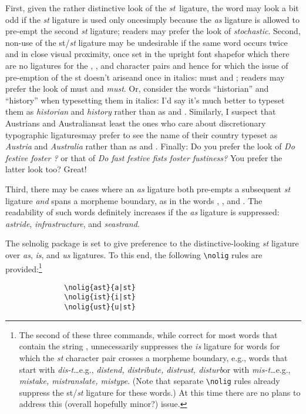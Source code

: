 \documentclass[11pt]{article}
\newcommand{\pkg}[1]{\textsf{#1}}
\newcommand{\opt}[1]{\uselig{\texttt{#1}}}
\newcommand{\cmmd}[1]{\texttt{\textbackslash #1}}
\begin{document}
First, given the rather distinctive look of the \emph{st}~ligature, the word \opt{stochastic} may look a bit odd if the \emph{st} ligature is used only once\textemdash\emph{}\textemdash simply because the \emph{as} ligature is allowed to pre-empt the second \emph{st} ligature; readers may prefer the look of \emph{stochastic}. Second, non-use of the st/\emph{st} ligature may be undesirable if the same word occurs twice and in close visual proximity, once set in the upright font shape\textemdash for which there are no ligatures for the \opt{as}, \opt{is}, and \opt{us} character pairs and hence for which the issue of pre-emption of the st doesn't arise\textemdash and once in italics: must and \emph{}; readers may prefer the look of must and \emph{must}. Or, consider the words \enquote{historian} and \enquote{history} when typesetting them in italics: I'd say it's much better to typeset them as \emph{historian} and \emph{history} rather than as \emph{} and \emph{}. Similarly, I suspect that Austrians and Australians\textemdash at least the ones who care about discretionary typographic ligatures\textemdash may prefer to see the name of their country typeset as \emph{Austria} and \emph{Australia} rather than as \emph{} and \emph{}. Finally: Do you prefer the look of \emph{Do  festive  foster ?} or that of \emph{Do fast festive fists foster fustiness?} You prefer the latter look too? Great! 

Third, there may be cases where an \emph{as} ligature both pre-empts a subsequent \emph{st} ligature \emph{and} spans a morpheme boundary, as in the words \emph{}, \emph{}, and \emph{}. The readability of such words definitely increases if the \emph{as} ligature is suppressed: \emph{astride}, \emph{infrastructure}, and \emph{seastrand}.

The \pkg{selnolig} package is set to give preference to the distinctive-looking \emph{st} ligature over \emph{as}, \emph{is}, and \emph{us} ligatures. To this end, the following \cmmd{nolig} rules are provided:\footnote{The second of these three commands, while correct for most words that contain the string \opt{ist}, unnecessarily suppresses the \emph{is} ligature for words for which the \emph{st} character pair crosses a morpheme boundary, e.g., words that start with \emph{dis-t\ldots}\textemdash e.g., \emph{distend, distribute, distrust, disturb}\textemdash or with \emph{mis-t\ldots}\textemdash e.g., \emph{mistake, mistranslate, mistype}. (Note that separate \cmmd{nolig} rules already suppress the st/\emph{st} ligature for these words.) At this time there are no plans to address this (overall hopefully minor?) issue.}
\begin{Verbatim}
              \nolig{ast}{a|st}
              \nolig{ist}{i|st}
              \nolig{ust}{u|st}
\end{Verbatim}
\end{document}
